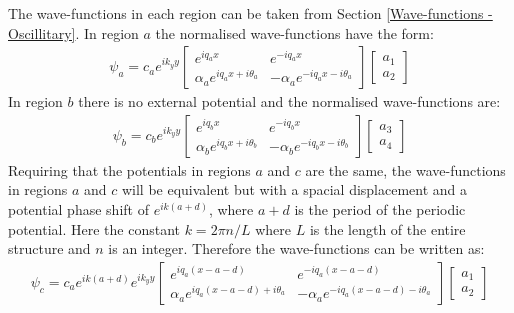 			The wave-functions in each region can be taken from Section \ref{Wave-functions - Oscillitary}. In region $a$ the normalised wave-functions have the form:
			\begin{align}
				\psi_{a}=
				c_{a}e^{ik_{y}y}
				\left[\begin{array}{ccc}
					e^{iq_{a}x}&e^{-iq_{a}x}\\
					\alpha_{a} e^{iq_{a}x+i\theta_{a}}&-\alpha_{a} e^{-iq_{a}x-i\theta_{a}}
				\end{array}\right]
				\left[\begin{array}{ccc}
					a_{1}\\
					a_{2}
				\end{array}\right]
			\end{align}
			In region $b$ there is no external potential and the normalised wave-functions are:
			\begin{align}
				\psi_{b}=
				c_{b}e^{ik_{y}y}
				\left[\begin{array}{ccc}
					e^{iq_{b}x}&e^{-iq_{b}x}\\
					\alpha_{b} e^{iq_{b}x+i\theta_{b}}&-\alpha_{b} e^{-iq_{b}x-i\theta_{b}}
				\end{array}\right]
				\left[\begin{array}{ccc}
					a_{3}\\
					a_{4}
				\end{array}\right]
			\end{align}
			Requiring that the potentials in regions $a$ and $c$ are the same, the wave-functions in regions $a$ and $c$ will be equivalent but with a spacial displacement and a potential phase shift of $e^{ik\left(a+d\right)}$, where $a+d$ is the period of the periodic potential. Here the constant $k=2\pi n/L$ where $L$ is the length of the entire structure and $n$ is an integer. Therefore the wave-functions can be written as:
			\begin{align}
				\psi_{c}=
				c_{a}e^{ik\left(a+d\right)}e^{ik_{y}y}
				\left[\begin{array}{ccc}
					e^{iq_{a}\left(x-a-d\right)}&e^{-iq_{a}\left(x-a-d\right)}\\
					\alpha_{a} e^{iq_{a}\left(x-a-d\right)+i\theta_{a}}&-\alpha_{a} e^{-iq_{a}\left(x-a-d\right)-i\theta_{a}}
				\end{array}\right]
				\left[\begin{array}{ccc}
					a_{1}\\
					a_{2}
				\end{array}\right]
			\end{align}
